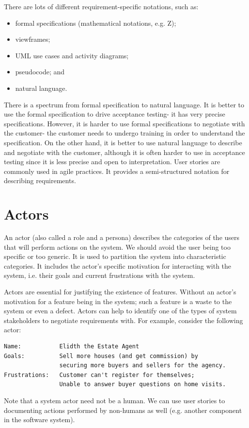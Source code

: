 \documentclass[a4paper, openany]{memoir}
\begin{document}
There are lots of different requirement-specific notations, such as:
\begin{itemize}
    \item formal specifications (mathematical notations, e.g. Z);
    \item viewframes;
    \item UML use cases and activity diagrams;
    \item pseudocode; and
    \item natural language.
\end{itemize}
There is a spectrum from formal specification to natural language. It is better to use the formal specification to drive acceptance testing- it has very precise specifications. However, it is harder to use formal specifications to negotiate with the customer- the customer needs to undergo training in order to understand the specification. On the other hand, it is better to use natural language to describe and negotiate with the customer, although it is often harder to use in acceptance testing since it is less precise and open to interpretation. User stories are commonly used in agile practices. It provides a semi-structured notation for describing requirements.

\section{Actors}
An actor (also called a role and a persona) describes the categories of the users that will perform actions on the system. We should avoid the user being too specific or too generic. It is used to partition the system into characteristic categories. It includes the actor's specific motivation for interacting with the system, i.e. their goals and current frustrations with the system.

Actors are essential for justifying the existence of features. Without an actor's motivation for a feature being in the system; such a feature is a waste to the system or even a defect. Actors can help to identify one of the types of system stakeholders to negotiate requirements with. For example, consider the following actor:
\begin{verbatim}
Name:           Elidth the Estate Agent
Goals:          Sell more houses (and get commission) by 
                securing more buyers and sellers for the agency.
Frustrations:   Customer can't register for themselves; 
                Unable to answer buyer questions on home visits.
\end{verbatim}
Note that a system actor need not be a human. We can use user stories to documenting actions performed by non-humans as well (e.g. another component in the software system). 
\end{document}
